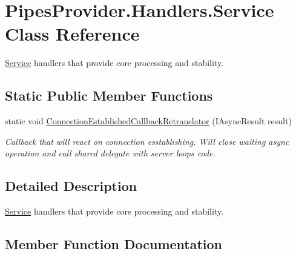 \hypertarget{class_pipes_provider_1_1_handlers_1_1_service}{}\section{Pipes\+Provider.\+Handlers.\+Service Class Reference}
\label{class_pipes_provider_1_1_handlers_1_1_service}


\mbox{\hyperlink{class_pipes_provider_1_1_handlers_1_1_service}{Service}} handlers that provide core processing and stability.  


\subsection*{Static Public Member Functions}
\begin{DoxyCompactItemize}
\item 
static void \mbox{\hyperlink{class_pipes_provider_1_1_handlers_1_1_service_a4ad834165c92fa663f270024d2d04a38}{Connection\+Established\+Callback\+Retranslator}} (I\+Async\+Result result)
\begin{DoxyCompactList}\small\item\em Callback that will react on connection esstablishing. Will close waiting async operation and call shared delegate with server loop\textquotesingle{}s code. \end{DoxyCompactList}\end{DoxyCompactItemize}


\subsection{Detailed Description}
\mbox{\hyperlink{class_pipes_provider_1_1_handlers_1_1_service}{Service}} handlers that provide core processing and stability. 



\subsection{Member Function Documentation}
\mbox{\label{class_pipes_provider_1_1_handlers_1_1_service_a4ad834165c92fa663f270024d2d04a38}} 
